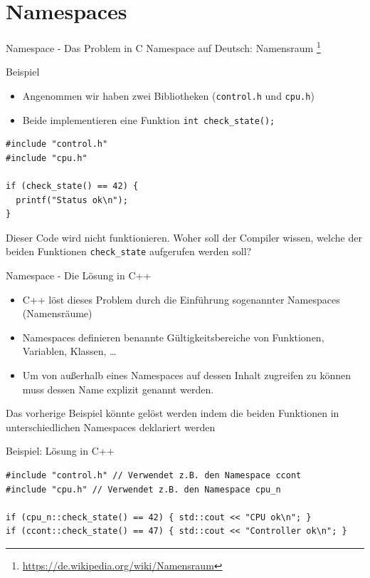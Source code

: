 \documentclass[presentation]{beamer}
\begin{document}
\section{Namespaces}
\label{sec:org05c9fbc}
\begin{frame}[fragile,label={sec:org0775f26}]{Namespace - Das Problem in C}
 Namespace auf Deutsch:
\alert{Namensraum} \footnote{\href{https://de.wikipedia.org/wiki/Namensraum}{https://de.wikipedia.org/wiki/Namensraum}}
\begin{block}{Beispiel}
\begin{itemize}
\item Angenommen wir haben zwei Bibliotheken ({\color{solarizedYellow}\texttt{control.h} }und {\color{solarizedYellow}\texttt{cpu.h}})
\item Beide implementieren eine Funktion {\color{solarizedYellow}\texttt{int check\_state();}}
\end{itemize}
\begin{verbatim}
#include "control.h"
#include "cpu.h"

if (check_state() == 42) {
  printf("Status ok\n");
}
\end{verbatim}
\end{block}
Dieser Code wird \alert{nicht funktionieren}. Woher soll der Compiler
wissen, welche der beiden Funktionen {\color{solarizedYellow}\texttt{check\_state} }aufgerufen werden
soll?
\end{frame}
\begin{frame}[fragile,label={sec:orgeb92dcf}]{Namespace - Die Lösung in C++}
 \begin{itemize}
\item C++ löst dieses Problem durch die Einführung sogenannter \alert{Namespaces}
(\alert{Namensräume})
\item Namespaces definieren \alert{benannte Gültigkeitsbereiche} von Funktionen,
Variablen, Klassen, \ldots{}
\item Um von außerhalb eines Namespaces auf dessen Inhalt zugreifen zu
können muss dessen \alert{Name explizit genannt} werden.
\end{itemize}
Das vorherige Beispiel könnte gelöst werden indem die beiden
Funktionen in unterschiedlichen Namespaces deklariert werden
\begin{exampleblock}{Beispiel: Lösung in C++}
\begin{verbatim}
#include "control.h" // Verwendet z.B. den Namespace ccont 
#include "cpu.h" // Verwendet z.B. den Namespace cpu_n

if (cpu_n::check_state() == 42) { std::cout << "CPU ok\n"; }
if (ccont::check_state() == 47) { std::cout << "Controller ok\n"; }
\end{verbatim}
\end{exampleblock}
\end{frame}
\end{document}
